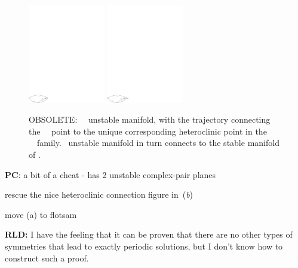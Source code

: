 \begin{figure} [t]
\begin{center}
\includegraphics[width=0.3\textwidth]{../figs/ks22_E1_UM_diag}
\includegraphics[width=0.3\textwidth]{../figs/ks22_E2_UM_diag}
\end{center}
\caption[OBSOLETE: EQV{1}~\eqv\ unstable manifold]
        {OBSOLETE:
~\eqv\ unstable manifold,
    with the trajectory connecting the
~\eqv\ point to the unique corresponding heteroclinic
point in the ~\eqv\ family.
~unstable manifold in turn connects  to the
stable manifold of .
        }
\label{f:KS22cage}
\end{figure}
{\bf PC}: a bit of a cheat -  has
    2 unstable complex-pair planes

rescue the nice heteroclinic connection figure
    in \,(\textit{b})

     move (a) to flotsam

{\bf RLD:} I have the feeling that it can be proven that there are
no other types of symmetries that lead to exactly periodic
solutions, but I don't know how to construct such a proof.

